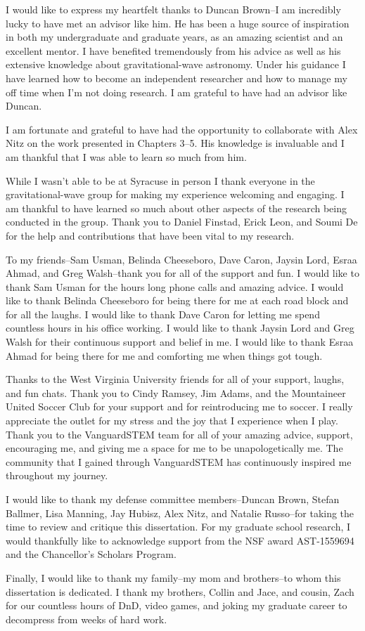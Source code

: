 I would like to express my heartfelt thanks to Duncan Brown--I am incredibly lucky to have met an advisor like him. He has been a huge source of inspiration in both my undergraduate and graduate years, as an amazing scientist and an excellent mentor. I have benefited tremendously from his advice as well as his extensive knowledge about gravitational-wave astronomy. Under his guidance I have learned how to become an independent researcher and how to manage my off time when I'm not doing research. I am grateful to have had an advisor like Duncan. 

I am fortunate and grateful to have had the opportunity to collaborate with Alex Nitz on the work presented in Chapters 3--5. His knowledge is invaluable and I am thankful that I was able to learn so much from him.

While I wasn't able to be at Syracuse in person I thank everyone in the gravitational-wave group for making my experience welcoming and engaging. I am thankful to have learned so much about other aspects of the research being conducted in the group. Thank you to Daniel Finstad, Erick Leon, and Soumi De for the help and contributions that have been vital to my research.

To my friends--Sam Usman, Belinda Cheeseboro, Dave Caron, Jaysin Lord, Esraa Ahmad, and Greg Walsh--thank you for all of the support and fun. I would like to thank Sam Usman for the hours long phone calls and amazing advice. I would like to thank Belinda Cheeseboro for being there for me at each road block and for all the laughs.  I would like to thank Dave Caron for letting me spend countless hours in his office working. I would like to thank Jaysin Lord and Greg Walsh for their continuous support and belief in me. I would like to thank Esraa Ahmad for being there for me and comforting me when things got tough. 

Thanks to the West Virginia University friends for all of your support, laughs, and fun chats.
Thank you to Cindy Ramsey, Jim Adams, and the Mountaineer United Soccer Club for your support and for reintroducing me to soccer. I really appreciate the outlet for my stress and the joy that I experience when I play.
Thank you to the VanguardSTEM team for all of your amazing advice, support, encouraging me, and giving me a space for me to be unapologetically me. The community that I gained through VanguardSTEM has continuously inspired me throughout my journey. 

I would like to  thank my defense committee members--Duncan Brown, Stefan Ballmer, Lisa Manning, Jay Hubisz, Alex Nitz, and Natalie Russo--for taking the time to review and critique this dissertation. For my graduate school research, I would thankfully like to acknowledge support from the NSF award AST-1559694 and the Chancellor's Scholars Program. 

Finally, I would like to thank my family--my mom and brothers--to whom this dissertation is dedicated. I thank my brothers, Collin and Jace, and cousin, Zach for our countless hours of DnD, video games, and joking my graduate career to decompress from weeks of hard work.    